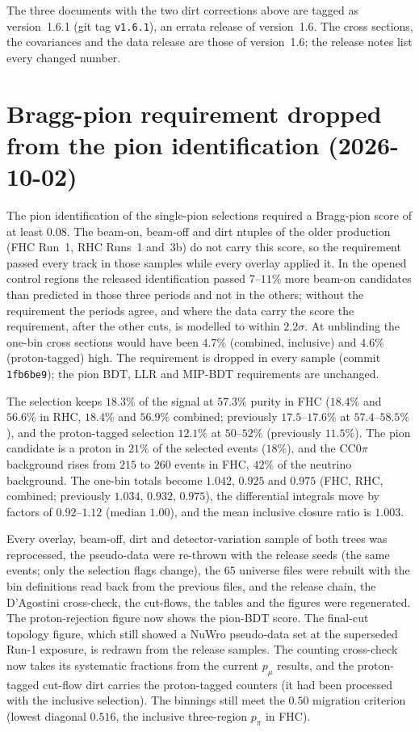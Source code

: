 The three documents with the two dirt corrections above are tagged as version~1.6.1 (git tag
\texttt{v1.6.1}), an errata release of version~1.6. The cross sections, the covariances and the data release
are those of version~1.6; the release notes list every changed number.

\section{Bragg-pion requirement dropped from the pion identification (2026-10-02)}

The pion identification of the single-pion selections required a Bragg-pion score of at least $0.08$. The
beam-on, beam-off and dirt ntuples of the older production (FHC Run~1, RHC Runs~1 and~3b) do not carry this
score, so the requirement passed every track in those samples while every overlay applied it. In the opened
control regions the released identification passed $7$--$11\%$ more beam-on candidates than predicted in those
three periods and not in the others; without the requirement the periods agree, and where the data carry the
score the requirement, after the other cuts, is modelled to within $2.2\sigma$. At unblinding the one-bin cross
sections would have been $4.7\%$ (combined, inclusive) and $4.6\%$ (proton-tagged) high. The requirement is
dropped in every sample (commit \texttt{1fb6be9}); the pion BDT, LLR and MIP-BDT requirements are unchanged.

The selection keeps $18.3\%$ of the signal at $57.3\%$ purity in FHC ($18.4\%$ and $56.6\%$ in RHC, $18.4\%$ and
$56.9\%$ combined; previously $17.5$--$17.6\%$ at $57.4$--$58.5\%$), and the proton-tagged selection $12.1\%$ at
$50$--$52\%$ (previously $11.5\%$). The pion candidate is a proton in $21\%$ of the selected events ($18\%$), and
the CC$0\pi$ background rises from $215$ to $260$ events in FHC, $42\%$ of the neutrino background. The one-bin
totals become $1.042$, $0.925$ and $0.975$ (FHC, RHC, combined; previously $1.034$, $0.932$, $0.975$), the
differential integrals move by factors of $0.92$--$1.12$ (median $1.00$), and the mean inclusive closure ratio is
$1.003$.

Every overlay, beam-off, dirt and detector-variation sample of both trees was reprocessed, the pseudo-data were
re-thrown with the release seeds (the same events; only the selection flags change), the $65$ universe files were
rebuilt with the bin definitions read back from the previous files, and the release chain, the D'Agostini
cross-check, the cut-flows, the tables and the figures were regenerated. The proton-rejection figure now shows the
pion-BDT score. The final-cut topology figure, which still showed a NuWro pseudo-data set at the superseded Run-1
exposure, is redrawn from the release samples. The counting cross-check now takes its systematic fractions from
the current $p_\mu$ results, and the proton-tagged cut-flow dirt carries the proton-tagged counters (it had been
processed with the inclusive selection). The binnings still meet the $0.50$ migration criterion (lowest diagonal
$0.516$, the inclusive three-region $p_\pi$ in FHC).

